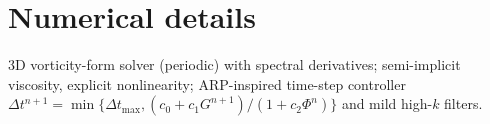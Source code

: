 \section{Numerical details}
3D vorticity-form solver (periodic) with spectral derivatives; semi-implicit viscosity, explicit nonlinearity; ARP-inspired time-step controller $\Delta t^{n+1}=\min\{\Delta t_{\max},(c_0+c_1 G^{n+1})/(1+c_2\Phi^n)\}$ and mild high-$k$ filters.
